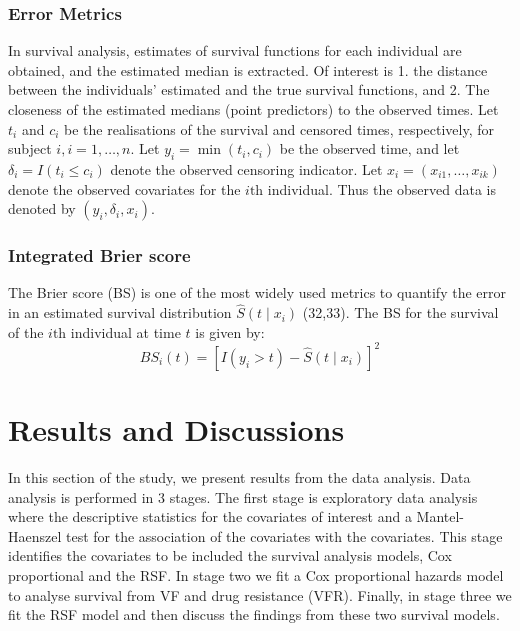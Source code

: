 \documentclass[10pt]{NSP1}
\begin{document}
\subsubsection{Error Metrics}
In survival analysis, estimates of survival functions for each individual are obtained, and the estimated median is extracted. Of interest is 1. the distance between the individuals' estimated and the true survival functions, and 2. The closeness of the estimated medians (point predictors) to the observed times. Let $t_i$ and $c_i$ be the realisations of the survival and censored times, respectively, for subject $i, i = 1, \dots, n$. Let $y_i = \min (t_i, c_i)$ be the observed time, and let $\delta_i = I(t_i \leq c_i)$ denote the observed censoring indicator. Let $x_i = (x_{i1}, \dots, x_{ik})$ denote the observed covariates for the $i\text{th}$ individual. Thus the observed data is denoted by $(y_i, \delta_i, x_i)$.

\subsubsection{Integrated Brier score}

The Brier score (BS) is one of the most widely used metrics to quantify the error in an estimated survival distribution $\hat{S}(t \mid x_i)$ (32,33). The BS for the survival of the $i\text{th}$ individual at time $t$ is given by:
\begin{equation}
BS_i(t) = \left[ I(y_i > t) - \hat{S}(t \mid x_i) \right]^2
\label{eq:brier_score}
\end{equation}


\section{Results and Discussions}
In this section of the study, we present results from the data analysis. Data analysis is performed in 3 stages. The first stage is exploratory data analysis where the descriptive statistics for the covariates of interest and a Mantel-Haenszel test for the association of the covariates with the covariates. This stage identifies the covariates to be included the survival analysis models, Cox proportional and the RSF. In stage two we fit a Cox proportional hazards model to analyse survival from VF and drug resistance (VFR). Finally, in stage three we fit the RSF model and then discuss the findings from these two survival models. 
\end{document}
